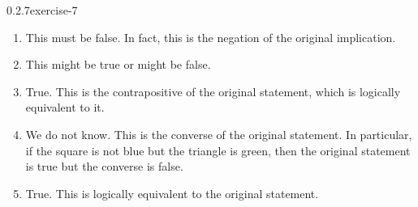\documentclass[twoside,11pt,]{book}
\numberwithin{equation}{chapter}
\begin{document}
\begin{divisionsolution}{0.2.7}{}{exercise-7}
\begin{enumerate}[label=(\alph*)]
\item\hypertarget{li-204}{}\hypertarget{p-224}{}%
This must be false. In fact, this is the negation of the original implication.%
\item\hypertarget{li-205}{}\hypertarget{p-225}{}%
This might be true or might be false.%
\item\hypertarget{li-206}{}\hypertarget{p-226}{}%
True. This is the contrapositive of the original statement, which is logically equivalent to it.%
\item\hypertarget{li-207}{}\hypertarget{p-227}{}%
We do not know. This is the converse of the original statement. In particular, if the square is not blue but the triangle is green, then the original statement is true but the converse is false.%
\item\hypertarget{li-208}{}\hypertarget{p-228}{}%
True. This is logically equivalent to the original statement.%
\end{enumerate}
%
\end{divisionsolution}%
\end{document}
